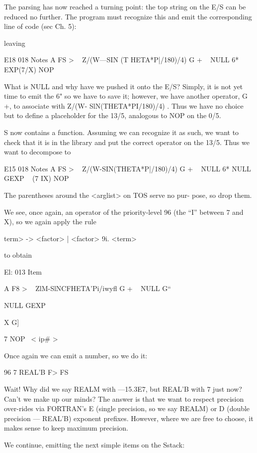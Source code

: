 The parsing has now reached a turning point: the top string on
the E/S can be reduced no further. The program must recognize
this and emit the corresponding line of code (sec Ch. 5):


 

leaving

E18 018 Notes
A FS > \ < subject >
Z/(W—SIN (T HETA*P|/180)/4) G + \ < term >
NULL 6*
EXP(7/X) NOP \ < function >

What is NULL and why have we pushed it onto the E/S? Simply,
it is not yet time to emit the 6" so we have to save it; however,
we have another operator, G +, to associate with Z/(W-
SlN(THETA*PI/180)/4) . Thus we have no choice but to define a
placeholder for the 13/5, analogous to NOP on the 0/5.

S now contains a function. Assuming we can recognize it as
such, we want to check that it is in the library and put the
correct operator on the 13/5. Thus we want to decompose to

 

E15 018 Notes
A FS > \ < subject >
Z/(W-SIN(THETA*P|/180)/4) G + \ < term >
NULL 6*
NULL GEXP \ < function >
(7 IX) NOP \ < arglist >

The parentheses around the <arglist> on TOS serve no pur-
pose, so drop them.

We see, once again, an operator of the priority-level 96 (the “I”
between 7 and X), so we again apply the rule

\<term> -> <factor> | <factor> 9i. <term>

to obtain

El: 013 Item

A F8 > \ < subject >
ZlM-SlNCFHETA'Pi/iwyﬂ G + \ < term >
NULL G“

NULL GEXP

X G] \ < id >

7 NOP \ < ip# >

Once again we can emit a number, so we do it:

96 7 REAL'B F> FS

Wait! Why did we say REALM with —15.3E7, but REAL'B with
7 just now? Can’t we make up our minds? The answer is that we
want to respect precision over-rides via FORTRAN's E (single
precision, so we say REALM) or D (double precision — REAL'B)
exponent prefixes. However, where we are free to choose, it
makes sense to keep maximum precision.

We continue, emitting the next simple items on the Sstack:

